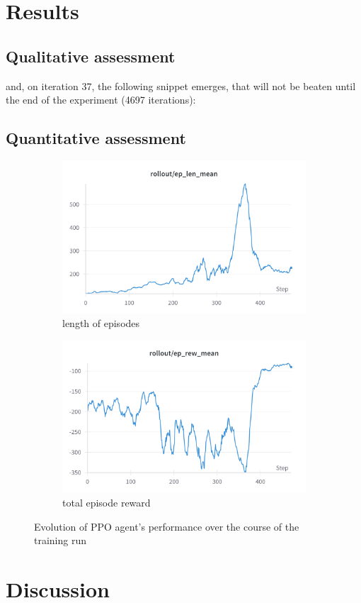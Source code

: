 \section{Results}

\subsection{Qualitative assessment}

and, on iteration 37, the following snippet emerges, that will not be beaten until the end of the experiment (4697 iterations):



\newpage
\subsection{Quantitative assessment}

\begin{figure}
    \begin{subfigure}{0.48\linewidth}
      \includegraphics[width=\linewidth]{images/auto-als-ppo-len.png}
      \caption{length of episodes}
    \end{subfigure}
    \begin{subfigure}{0.48\linewidth}
      \includegraphics[width=\linewidth]{images/auto-als-ppo-rew.png}
      \caption{total episode reward}
    \end{subfigure}
    \caption{Evolution of PPO agent's performance over the course of the training run}
\end{figure}

\newpage
\section{Discussion}